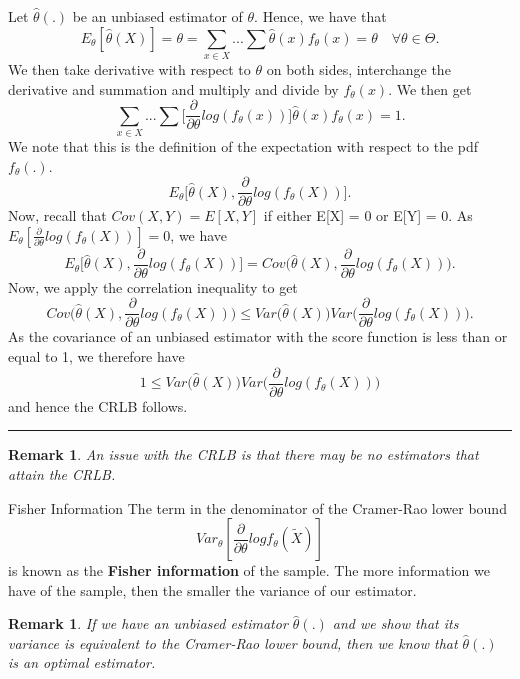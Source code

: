 \documentclass[twoside]{article}
\newtheorem{remark}[theorem]{Remark}
\newenvironment{proof}{{\bf Proof:}}{\hfill\rule{2mm}{2mm}}
\begin{document}
\begin{proof} Let $\hat{\theta}(.)$ be an unbiased estimator of $\theta.$ Hence, we have that 
$$
E_{\theta}[\hat{\theta}(X)] = \theta = \sum_{x \in X}...\sum \hat{\theta}(x)f_{\theta}(x) = \theta \quad \forall \theta \in \Theta.
$$
We then take derivative with respect to $\theta$ on both sides, interchange the derivative and summation and multiply and divide by $f_{\theta}(x)$. We then get 
$$
\sum_{x \in X}...\sum \bigg[\frac{\partial}{\partial \theta}log(f_{\theta}(x)) \bigg]\hat{\theta}(x)f_{\theta}(x) = 1.
$$
We note that this is the definition of the expectation with respect to the pdf $f_{\theta}(.)$.
$$
E_{\theta}\bigg[\hat{\theta}(X),\frac{\partial}{\partial \theta}log(f_{\theta}(X)) \bigg].
$$
Now, recall that $Cov(X,Y) = E[X,Y]$ if either E[X] = 0 or E[Y] = 0. As $E_{\theta}[\frac{\partial}{\partial \theta}log(f_{\theta}(X))] = 0$, we have 
$$
E_{\theta}\bigg[\hat{\theta}(X),\frac{\partial}{\partial \theta}log(f_{\theta}(X)) \bigg] = Cov \bigg(\hat{\theta}(X), \frac{\partial}{\partial \theta}log(f_{\theta}(X))\bigg).
$$
Now, we apply the correlation inequality to get 
$$
Cov \bigg(\hat{\theta}(X), \frac{\partial}{\partial \theta}log(f_{\theta}(X))\bigg) \leq Var \bigg(\hat{\theta}(X)\bigg) Var\bigg(\frac{\partial}{\partial \theta}log(f_{\theta}(X))\bigg).
$$
As the covariance of an unbiased estimator with the score function is less than or equal to 1, we therefore have 
$$
1 \leq Var \bigg(\hat{\theta}(X)\bigg) Var\bigg(\frac{\partial}{\partial \theta}log(f_{\theta}(X))\bigg)
$$
and hence the CRLB follows.
\end{proof}

\begin{remark}An issue with the CRLB is that there may be no estimators that attain the CRLB.
\end{remark}


\begin{definition_exam}{Fisher Information}{} The term in the denominator of the Cramer-Rao lower bound $$Var_{\theta}[\frac{\partial}{\partial \theta}logf_{\theta}(\tilde{X})]$$ is known as the \textbf{Fisher information} of the sample. The more information we have of the sample, then the smaller the variance of our estimator.
\end{definition_exam}

\begin{remark}If we have an unbiased estimator $\hat{\theta}(.)$ and we show that its variance is equivalent to the Cramer-Rao lower bound, then we know that $\hat{\theta}(.)$ is an optimal estimator.
\end{remark}
\end{document}
